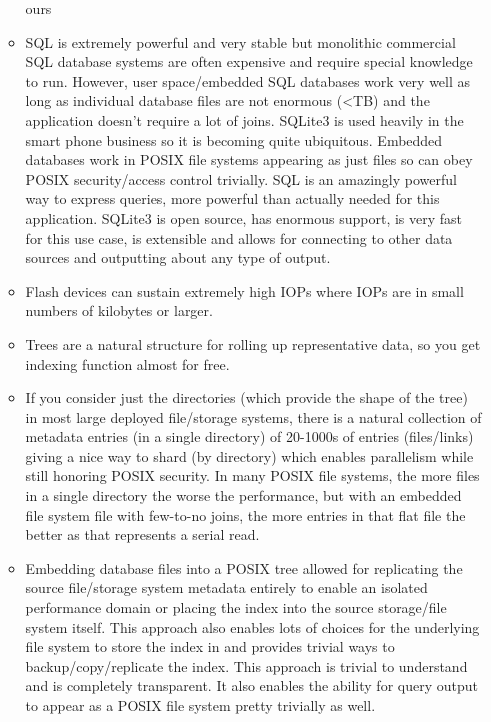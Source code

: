 \begin{itemize}
\begin{itemize}
    ours
  \item SQL is extremely powerful and very stable but monolithic
    commercial SQL database systems are often expensive and require
    special knowledge to run. However, user space/embedded SQL
    databases work very well as long as individual database files are
    not enormous (\textless TB) and the application doesn't require a lot of
    joins.  SQLite3 is used heavily in the smart phone business so it
    is becoming quite ubiquitous.  Embedded databases work in POSIX
    file systems appearing as just files so can obey POSIX
    security/access control trivially.  SQL is an amazingly powerful
    way to express queries, more powerful than actually needed for
    this application.  SQLite3 is open source, has enormous support,
    is very fast for this use case, is extensible and allows for
    connecting to other data sources and outputting about any type of
    output.
  \item Flash devices can sustain extremely high IOPs where IOPs are
    in small numbers of kilobytes or larger.
  \item Trees are a natural structure for rolling up representative
    data, so you get indexing function almost for free.
  \item If you consider just the directories (which provide the shape
    of the tree) in most large deployed file/storage systems, there is
    a natural collection of metadata entries (in a single directory)
    of 20-1000s of entries (files/links) giving a nice way to shard
    (by directory) which enables parallelism while still honoring
    POSIX security. In many POSIX file systems, the more files in a
    single directory the worse the performance, but with an embedded
    file system file with few-to-no joins, the more entries in that
    flat file the better as that represents a serial read.
  \item Embedding database files into a POSIX tree allowed for
    replicating the source file/storage system metadata entirely to
    enable an isolated performance domain or placing the index into
    the source storage/file system itself.  This approach also enables
    lots of choices for the underlying file system to store the index
    in and provides trivial ways to backup/copy/replicate the index.
    This approach is trivial to understand and is completely
    transparent.  It also enables the ability for query output to
    appear as a POSIX file system pretty trivially as well.
  \end{itemize}
\end{itemize}
